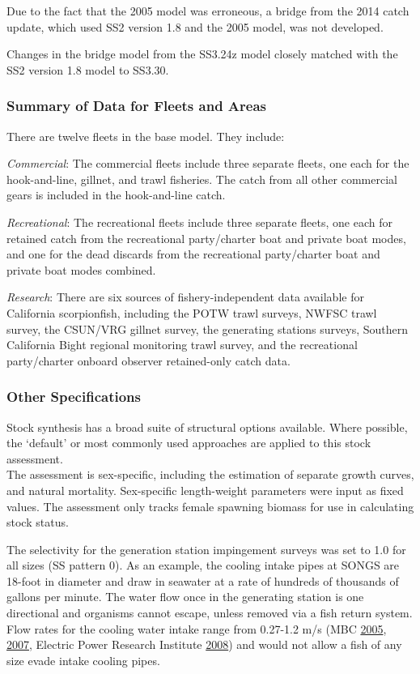 \documentclass[12pt,]{article}
\begin{document}
Due to the fact that the 2005 model was erroneous, a bridge from the
2014 catch update, which used SS2 version 1.8 and the 2005 model, was
not developed.

Changes in the bridge model from the SS3.24z model closely matched with
the SS2 version 1.8 model to SS3.30.

\subsubsection{Summary of Data for Fleets and
Areas}\label{summary-of-data-for-fleets-and-areas}

There are twelve fleets in the base model. They include:

\emph{Commercial}: The commercial fleets include three separate fleets,
one each for the hook-and-line, gillnet, and trawl fisheries. The catch
from all other commercial gears is included in the hook-and-line catch.

\emph{Recreational}: The recreational fleets include three separate
fleets, one each for retained catch from the recreational party/charter
boat and private boat modes, and one for the dead discards from the
recreational party/charter boat and private boat modes combined.

\emph{Research}: There are six sources of fishery-independent data
available for California scorpionfish, including the POTW trawl surveys,
NWFSC trawl survey, the CSUN/VRG gillnet survey, the generating stations
surveys, Southern California Bight regional monitoring trawl survey, and
the recreational party/charter onboard observer retained-only catch
data.

\subsubsection{Other Specifications}\label{other-specifications}

Stock synthesis has a broad suite of structural options available. Where
possible, the `default' or most commonly used approaches are applied to
this stock assessment.\\
The assessment is sex-specific, including the estimation of separate
growth curves, and natural mortality. Sex-specific length-weight
parameters were input as fixed values. The assessment only tracks female
spawning biomass for use in calculating stock status.

The selectivity for the generation station impingement surveys was set
to 1.0 for all sizes (SS pattern 0). As an example, the cooling intake
pipes at SONGS are 18-foot in diameter and draw in seawater at a rate of
hundreds of thousands of gallons per minute. The water flow once in the
generating station is one directional and organisms cannot escape,
unless removed via a fish return system. Flow rates for the cooling
water intake range from 0.27-1.2 m/s (MBC
\protect\hyperlink{ref-MBC2005}{2005},
\protect\hyperlink{ref-MBC2007}{2007}, Electric Power Research Institute
\protect\hyperlink{ref-EPRI2008}{2008}) and would not allow a fish of
any size evade intake cooling pipes.
\end{document}
